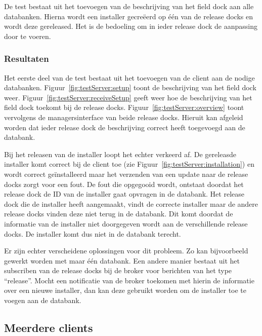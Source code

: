 De test bestaat uit het toevoegen van de beschrijving van het field dock aan alle databanken.
Hierna wordt een installer gecreëerd op één van de release docks en wordt deze gereleased.
Het is de bedoeling om in ieder release dock de aanpassing door te voeren.

\subsubsection{Resultaten}
Het eerste deel van de test bestaat uit het toevoegen van de client aan de nodige databanken.
Figuur~\ref{fig:testServer:setup} toont de beschrijving van het field dock weer.
Figuur~\ref{fig:testServer:receiveSetup} geeft weer hoe de beschrijving van het field dock toekomt bij de release docks.
Figuur~\ref{fig:testServer:overview} toont vervolgens de managersinterface van beide release docks.
Hieruit kan afgeleid worden dat ieder release dock de beschrijving correct heeft toegevoegd aan de databank.

Bij het releasen van de installer loopt het echter verkeerd af.
De gereleasde installer komt correct bij de client toe (zie Figuur~\ref{fig:testServer:installation}) en wordt correct geïnstalleerd  maar het verzenden van een update naar de release docks zorgt voor een fout.
De fout die opgegooid wordt, ontstaat doordat het release dock de ID van de installer gaat opvragen in de databank.
Het release dock die de installer heeft aangemaakt, vindt de correcte installer maar de andere release docks vinden deze niet terug in de databank.
Dit komt doordat de informatie van de installer niet doorgegeven wordt aan de verschillende release docks.
De installer komt dus niet in de databank terecht.

Er zijn echter verscheidene oplossingen voor dit probleem.
Zo kan bijvoorbeeld gewerkt worden met maar één databank.
Een andere manier bestaat uit het subscriben van de release docks bij de broker voor berichten van het type ``release''.
Mocht een notificatie van de broker toekomen met hierin de informatie over een nieuwe installer, dan kan deze gebruikt worden om de installer toe te voegen aan de databank.

\subsection{Meerdere clients}
